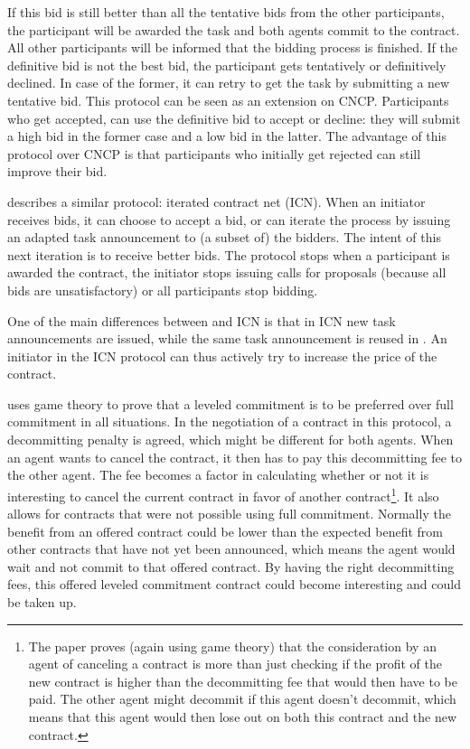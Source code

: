 \documentclass[10pt,a4paper,twocolumn]{article}
\begin{document}
If this bid is still better than all the tentative bids from the other participants, the participant will be awarded the task and both agents commit to the contract. All other participants will be informed that the bidding process is finished. If the definitive bid is not the best bid, the participant gets tentatively or definitively declined. In case of the former, it can retry to get the task by submitting a new tentative bid. This protocol can be seen as an extension on CNCP. Participants who get accepted, can use the definitive bid to accept or decline: they will submit a high bid in the former case and a low bid in the latter. The advantage of this protocol over CNCP is that participants who initially get rejected can still improve their bid.

\cite{CNETIterativeStandard} describes a similar protocol: iterated contract net (ICN). When an initiator receives bids, it can choose to accept a bid, or can iterate the process by issuing an adapted task announcement to (a subset of) the bidders. The intent of this next iteration is to receive better bids. The protocol stops when a participant is awarded the contract, the initiator stops issuing calls for proposals (because all bids are unsatisfactory) or all participants stop bidding.

One of the main differences between \cite{TentativeBidding} and ICN is that in ICN new task announcements are issued, while the same task announcement is reused in \cite{TentativeBidding}. An initiator in the ICN protocol can thus actively try to increase the price of the contract.  

\cite{LeveledCommitment} uses game theory to prove that a leveled commitment is to be preferred over full commitment in all situations. In the negotiation of a contract in this protocol, a decommitting penalty is agreed, which might be different for both agents. When an agent wants to cancel the contract, it then has to pay this decommitting fee to the other agent. The fee becomes a factor in calculating whether or not it is interesting to cancel the current contract in favor of another contract\footnote{The paper proves (again using game theory) that the consideration by an agent of canceling a contract is more than just checking if the profit of the new contract is higher than the decommitting fee that would then have to be paid. The other agent might decommit if this agent doesn't decommit, which means that this agent would then lose out on both this contract and the new contract.}. It also allows for contracts that were not possible using full commitment. Normally the benefit from an offered contract could be lower than the expected benefit from other contracts that have not yet been announced, which means the agent would wait and not commit to that offered contract. By having the right decommitting fees, this offered leveled commitment contract could become interesting and could be taken up.
\end{document}
